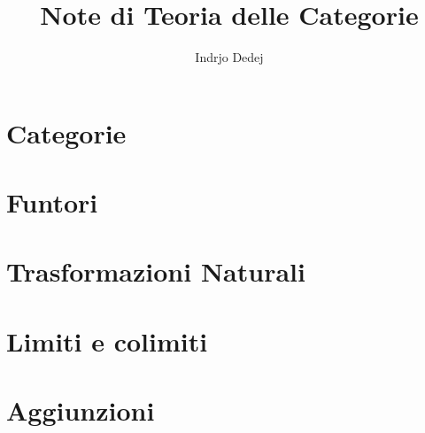 




\title{Note di Teoria delle Categorie}
\author{Indrjo Dedej}



\frontmatter %



\tableofcontents

\mainmatter %

\chapter{Categorie}







\chapter{Funtori}





\chapter{Trasformazioni Naturali}


\chapter{Limiti e colimiti}







\chapter{Aggiunzioni}


\backmatter %

\cleardoublepage

\printbibliography

\printindex                 %


